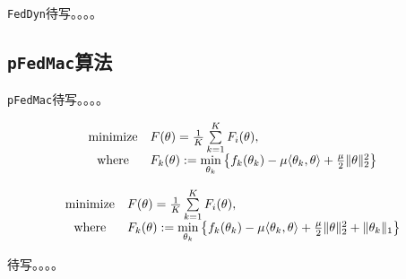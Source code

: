 \parencite{acar2021feddyn}  \texttt{FedDyn}待写。。。。






\subsection*{\texttt{pFedMac}算法}

\parencite{li2021pfedmac}  \texttt{pFedMac}待写。。。。

\begin{equation}
\label{eq:pfedmac}
\begin{array}{cl}
\operatorname*{minimize} & F(\theta) = \frac{1}{K} \sum\limits_{k=1}^K F_i(\theta), \\
\text{where} & F_k(\theta) := \mathop{\rm min}\limits_{\theta_k} \left\{ f_k(\theta_k) - \mu \langle \theta_k, \theta \rangle + \frac{\mu}{2} \lVert \theta \rVert^2_2 \right\}
\end{array}
\end{equation}

\begin{equation}
\label{eq:pfedmac-sparse}
\begin{array}{cl}
\operatorname*{minimize} & F(\theta) = \frac{1}{K} \sum\limits_{k=1}^K F_i(\theta), \\
\text{where} & F_k(\theta) := \mathop{\rm min}\limits_{\theta_k} \left\{ f_k(\theta_k) - \mu \langle \theta_k, \theta \rangle + \frac{\mu}{2} \lVert \theta \rVert^2_2 + \lVert \theta_k \rVert_1 \right\}
\end{array}
\end{equation}



待写。。。。
